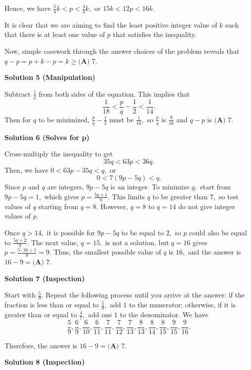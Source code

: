 \begin{enumerate}
 Hence, we have $\frac{5}{4}k<p<\frac{4}{3}k,$ or $15k<12p<16k.$

 It is clear that we are aiming to find the least positive integer value of $k$ such that there is at least one value of $p$ that satisfies the inequality.

 Now, simple casework through the answer choices of the problem reveals that $q-p=p+k-p=k\ge{\boxed{\textbf{(A) } 7}}.$




\textbf{Solution 5 (Manipulation)}

Subtract $\frac{1}{2}$ from both sides of the equation. This implies that 
 \[\frac{1}{18} < \frac{p}{q}-\frac{1}{2} < \frac{1}{14}.\] Then for $q$ to be minimized, $\frac{p}{q}-\frac{1}{2}$ must be $\frac{1}{16},$ so $\frac{p}{q}$ is $\frac{9}{16}$ and $q-p$ is $\boxed{\textbf{(A) } 7}.$




\textbf{Solution 6 (Solves for p)}

Cross-multiply the inequality to get 
 \[35q < 63p < 36q.\]Then, we have $0 < 63p-35q < q,$ or 
 \[0 < 7(9p-5q) < q.\]Since $p$ and $q$ are integers, $9p-5q$ is an integer. To minimize $q,$ start from $9p-5q=1,$ which gives $p=\frac{5q+1}{9}.$ This limits $q$ to be greater than $7,$ so test values of $q$ starting from $q=8.$ However, $q=8$ to $q=14$ do not give integer values of $p.$ 

 Once $q>14,$ it is possible for $9p-5q$ to be equal to $2,$ so $p$ could also be equal to $\frac{5q+2}{9}.$ The next value, $q=15,$ is not a solution, but $q=16$ gives $p=\frac{5\cdot 16 + 1}{9} = 9.$ Thus, the smallest possible value of $q$ is $16,$ and the answer is $16-9= \boxed{\textbf{(A) } 7}.$




\textbf{Solution 7 (Inspection)}

Start with $\frac{5}{9}.$ Repeat the following process until you arrive at the answer: if the fraction is less than or equal to $\frac{5}{9},$ add $1$ to the numerator; otherwise, if it is greater than or equal to $\frac{4}{7},$ add one $1$ to the denominator. We have 
 \[\frac{5}{9}, \frac{6}{9}, \frac{6}{10}, \frac{6}{11}, \frac{7}{11}, \frac{7}{12}, \frac{7}{13}, \frac{8}{13}, \frac{8}{14}, \frac{8}{15}, \frac{9}{15}, \frac{9}{16}.\]

 Therefore, the answer is $16 - 9 = \boxed{\textbf{(A) } 7}.$




\textbf{Solution 8 (Inspection)}


\end{enumerate}
